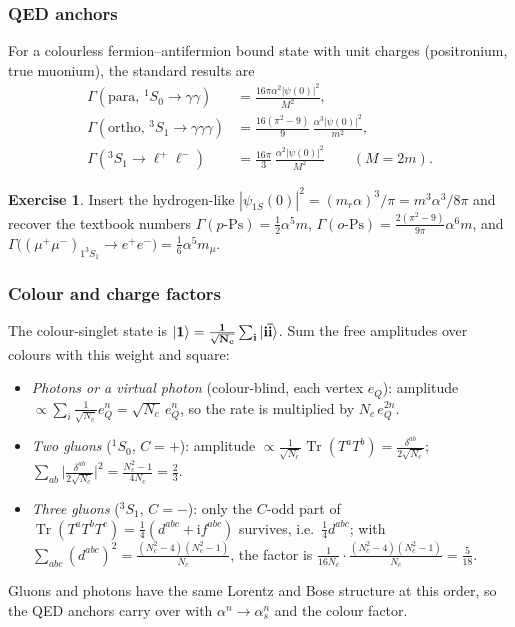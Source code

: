 \documentclass[11pt,a4paper]{article}
\numberwithin{equation}{section}
\theoremstyle{definition}
\newtheorem{exercise}[definition]{Exercise}
\theoremstyle{plain}
\theoremstyle{remark}
\numberwithin{algorithm}{section}
\newcommand{\as}{\alpha_s}
\newcommand{\ii}{\mathrm{i}}
\newcommand{\mr}{m_r}
\newcommand{\ket}[1]{|#1\rangle}
\begin{document}
\subsubsection{QED anchors}
For a colourless fermion--antifermion bound state with unit charges (positronium, true muonium), the standard results are
\begin{align}
\Gamma(\text{para},\,{}^1S_0\to\gamma\gamma)&=\frac{16\pi\alpha^2|\psi(0)|^2}{M^2},\nonumber\\
\Gamma(\text{ortho},\,{}^3S_1\to\gamma\gamma\gamma)&=\frac{16(\pi^2-9)}{9}\,\frac{\alpha^3|\psi(0)|^2}{m^2},\label{eq:qedanchors}\\
\Gamma({}^3S_1\to\ell^+\ell^-)&=\frac{16\pi}{3}\,\frac{\alpha^2|\psi(0)|^2}{M^2}\qquad(M=2m).\nonumber
\end{align}
\begin{exercise}
Insert the hydrogen-like $|\psi_{1S}(0)|^2=(\mr\alpha)^3/\pi=m^3\alpha^3/8\pi$ and recover the textbook numbers $\Gamma(p\text{-Ps})=\frac12\alpha^5m$, $\Gamma(o\text{-Ps})=\frac{2(\pi^2-9)}{9\pi}\alpha^6m$, and $\Gamma\big((\mu^+\mu^-)_{1^3S_1}\to e^+e^-\big)=\frac16\alpha^5m_\mu$.
\end{exercise}

\subsubsection{Colour and charge factors}
The colour-singlet state is $\ket{\bf 1}=\frac1{\sqrt{N_c}}\sum_i\ket{i\bar i}$. Sum the free amplitudes over colours with this weight and square:
\begin{itemize}[leftmargin=1.3em,itemsep=2pt]
\item \emph{Photons or a virtual photon} (colour-blind, each vertex $e_Q$): amplitude $\propto\sum_i\frac{1}{\sqrt{N_c}}e_Q^n=\sqrt{N_c}\,e_Q^n$, so the rate is multiplied by $N_c\,e_Q^{2n}$.
\item \emph{Two gluons} (${}^1S_0$, $C=+$): amplitude $\propto\frac1{\sqrt{N_c}}\operatorname{Tr}(T^aT^b)=\frac{\delta^{ab}}{2\sqrt{N_c}}$; $\sum_{ab}\big|\frac{\delta^{ab}}{2\sqrt{N_c}}\big|^2=\frac{N_c^2-1}{4N_c}=\frac23$.
\item \emph{Three gluons} (${}^3S_1$, $C=-$): only the $C$-odd part of $\operatorname{Tr}(T^aT^bT^c)=\frac14(d^{abc}+\ii f^{abc})$ survives, i.e.\ $\frac14d^{abc}$; with $\sum_{abc}(d^{abc})^2=\frac{(N_c^2-4)(N_c^2-1)}{N_c}$, the factor is $\frac{1}{16N_c}\cdot\frac{(N_c^2-4)(N_c^2-1)}{N_c}=\frac{5}{18}$.
\end{itemize}
Gluons and photons have the same Lorentz and Bose structure at this order, so the QED anchors carry over with $\alpha^n\to\as^n$ and the colour factor.
\end{document}
